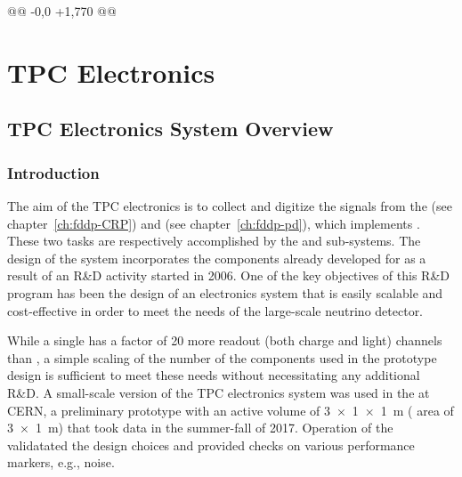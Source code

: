 @@ -0,0 +1,770 @@
\chapter{TPC Electronics}
\label{ch:fddp-tpc-elec}


\section{TPC Electronics System Overview}
\label{sec:fddp-tpc-elec-ov}

\subsection{Introduction}
\label{sec:fddp-tpc-elec-intro}

The aim of the  TPC electronics is to collect and digitize the signals from the %
 (see chapter~\ref{ch:fddp-CRP}) and  (see chapter~\ref{ch:fddp-pd}), which implements %
. %
These two tasks are respectively accomplished by the  and  sub-systems.
The design of the system incorporates the components already developed for  as a result of an R\&D activity started in 2006. One of the key objectives of this R\&D program has been the design of an electronics system that is easily scalable and cost-effective in order to meet the needs of the large-scale neutrino  detector.  %

While a single  has a factor of \num{20} more readout (both charge and light) channels than , a simple scaling of the number of the components used in the prototype design is sufficient to meet these needs without necessitating any additional R\&D. A small-scale version of the TPC electronics system was used in the  at CERN, a preliminary \dual \lartpc prototype with an active volume  of \SI[product-units=power]{3x1x1}{m} ( area of \SI[product-units=power]{3x1}{m}) that took data in the summer-fall of 2017. %
Operation of the  validatated the design choices and provided checks on various performance markers, e.g., noise. 

